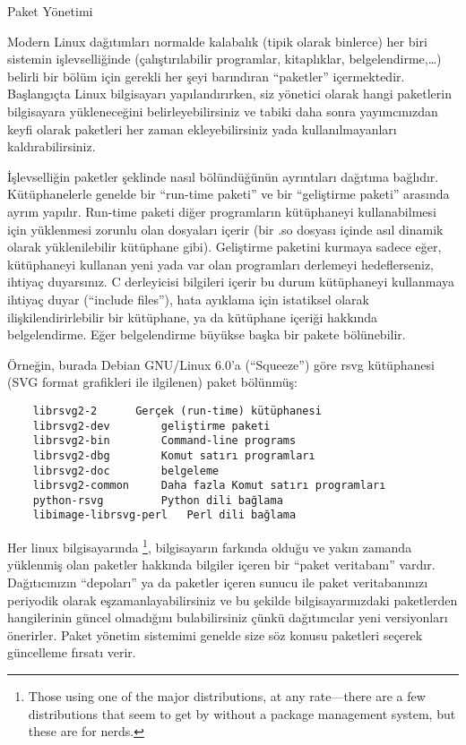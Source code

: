 \begin{section}{Paket Yönetimi}

Modern Linux dağıtımları normalde kalabalık (tipik olarak binlerce) her biri sistemin işlevselliğinde (çalıştırılabilir programlar, kitaplıklar, belgelendirme,…) belirli bir bölüm için gerekli her şeyi barındıran “paketler” içermektedir. Başlangıçta Linux bilgisayarı yapılandırırken, siz yönetici olarak hangi paketlerin bilgisayara yükleneceğini belirleyebilirsiniz ve tabiki daha sonra yayımcınızdan keyfi olarak paketleri her zaman ekleyebilirsiniz yada kullanılmayanları kaldırabilirsiniz.

İşlevselliğin paketler şeklinde nasıl bölündüğünün ayrıntıları dağıtıma bağlıdır. Kütüphanelerle genelde bir “run-time paketi” ve bir “geliştirme paketi” arasında ayrım yapılır. Run-time paketi diğer programların kütüphaneyi kullanabilmesi için yüklenmesi zorunlu olan dosyaları içerir (bir .so dosyası içinde asıl dinamik olarak yüklenilebilir kütüphane gibi). Geliştirme paketini kurmaya sadece eğer, kütüphaneyi kullanan yeni yada var olan programları derlemeyi hedeflerseniz, ihtiyaç duyarsınız. C derleyicisi bilgileri içerir bu durum kütüphaneyi kullanmaya ihtiyaç duyar (“include files”), hata ayıklama için istatiksel olarak ilişkilendirirlebilir bir kütüphane, ya da kütüphane içeriği hakkında belgelendirme. Eğer belgelendirme büyükse başka bir pakete bölünebilir.

Örneğin, burada Debian GNU/Linux 6.0'a (“Squeeze”) göre rsvg kütüphanesi (SVG format grafikleri ile ilgilenen) paket bölünmüş: 
\begin{verbatim}
	librsvg2-2 		Gerçek (run-time) kütüphanesi
	librsvg2-dev 		geliştirme paketi
	librsvg2-bin 		Command-line programs
	librsvg2-dbg 		Komut satırı programları
	librsvg2-doc 		belgeleme
	librsvg2-common 	Daha fazla Komut satırı programları
	python-rsvg 		Python dili bağlama
	libimage-librsvg-perl 	Perl dili bağlama
\end{verbatim}

Her linux bilgisayarında
\footnote{Those using one of the major distributions, at any rate—there are a few distributions that seem to get by without a package management system, but these are for nerds.}, bilgisayarın farkında olduğu ve yakın zamanda yüklenmiş olan paketler hakkında bilgiler içeren bir “paket veritabanı” vardır. Dağıtıcınızın “depoları” ya da paketler içeren sunucu ile paket veritabanınızı periyodik olarak eşzamanlayabilirsiniz ve bu şekilde bilgisayarınızdaki paketlerden hangilerinin güncel olmadığını bulabilirsiniz çünkü dağıtımcılar yeni versiyonları önerirler. Paket yönetim sistemimi genelde size söz konusu paketleri seçerek güncelleme fırsatı verir.


\end{section}
